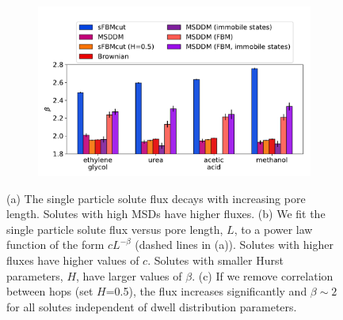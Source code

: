 \documentclass{article}
\begin{document}
\begin{figure}
\begin{subfigure}{0.325\textwidth}
  \caption{}\label{fig:c_parameters}
  \end{subfigure}
  \begin{subfigure}{0.325\textwidth}
  \includegraphics[width=\textwidth]{beta_parameters.pdf}
  \caption{}\label{fig:beta_parameters}
  \end{subfigure}
  \caption{(a) The single particle solute flux decays with increasing pore length. 
  Solutes with high MSDs have higher fluxes. (b) We fit the single particle solute flux 
  versus pore length, $L$, to a power law function of the form $cL^{-\beta}$ (dashed 
  lines in (a)). Solutes with higher fluxes have higher values of $c$. Solutes with 
  smaller Hurst parameters, $H$, have larger values of $\beta$. (c) If we remove 
  correlation between hops (set $H$=0.5), the flux increases significantly and 
  $\beta \sim 2$ for all solutes independent of dwell distribution
  parameters.}\label{fig:flux_curves}
  \end{figure}
  
\end{document}

